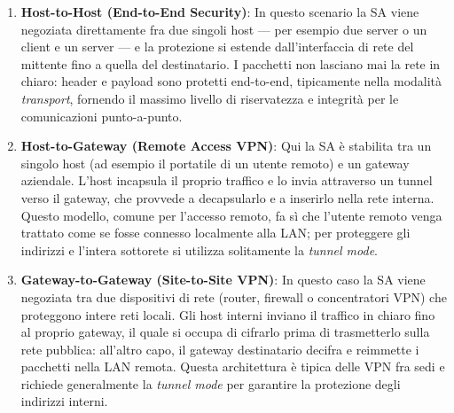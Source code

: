 \documentclass[a4paper, 11pt]{article}
\begin{document}
\begin{enumerate}
    \item \textbf{Host-to-Host (End-to-End Security)}:
    In questo scenario la SA viene negoziata direttamente fra due singoli host — per esempio due server o un client e un server — e la protezione si estende dall'interfaccia di rete del mittente fino a quella del destinatario. I pacchetti non lasciano mai la rete in chiaro: header e payload sono protetti end-to-end, tipicamente nella modalità \textit{transport}, fornendo il massimo livello di riservatezza e integrità per le comunicazioni punto-a-punto.

    \item \textbf{Host-to-Gateway (Remote Access VPN)}:
    Qui la SA è stabilita tra un singolo host (ad esempio il portatile di un utente remoto) e un gateway aziendale. L'host incapsula il proprio traffico e lo invia attraverso un tunnel verso il gateway, che provvede a decapsularlo e a inserirlo nella rete interna. Questo modello, comune per l'accesso remoto, fa sì che l'utente remoto venga trattato come se fosse connesso localmente alla LAN; per proteggere gli indirizzi e l'intera sottorete si utilizza solitamente la \textit{tunnel mode}.

    \item \textbf{Gateway-to-Gateway (Site-to-Site VPN)}:
    In questo caso la SA viene negoziata tra due dispositivi di rete (router, firewall o concentratori VPN) che proteggono intere reti locali. Gli host interni inviano il traffico in chiaro fino al proprio gateway, il quale si occupa di cifrarlo prima di trasmetterlo sulla rete pubblica: all'altro capo, il gateway destinatario decifra e reimmette i pacchetti nella LAN remota. Questa architettura è tipica delle VPN fra sedi e richiede generalmente la \textit{tunnel mode} per garantire la protezione degli indirizzi interni.
\end{enumerate}
\end{document}
